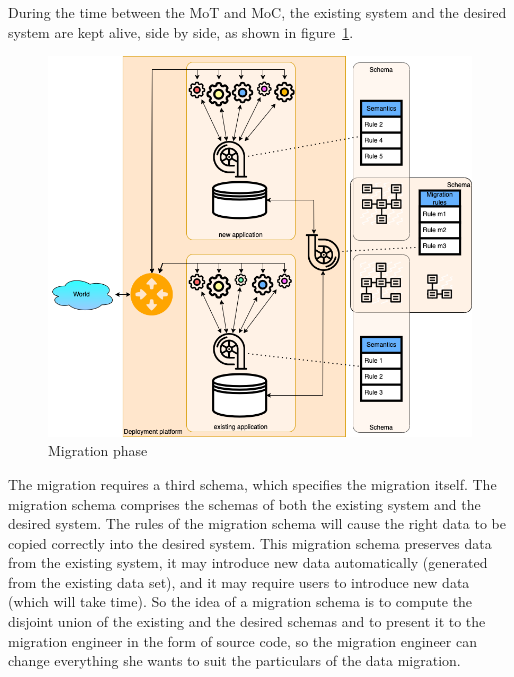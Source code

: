 \documentclass{elsarticle}
\begin{document}
   During the time between the MoT and MoC,
   the existing system and the desired system are kept alive, side by side, as shown in figure~\ref{fig:migration phase}.
\begin{figure}[bht]
   \begin{center}
     \includegraphics[scale=.35]{figures/datamigration-Migration phase.png}
   \end{center}
\caption{Migration phase}
\label{fig:migration phase}
\end{figure}

   The migration requires a third schema, which specifies the migration itself.
   The migration schema comprises the schemas of both the existing system and the desired system.
   The rules of the migration schema will cause the right data to be copied correctly into the desired system.
   This migration schema preserves data from the existing system, it may introduce new data automatically (generated from the existing data set),
   and it may require users to introduce new data (which will take time). 
   So the idea of a migration schema is to compute the disjoint union of the existing and the desired schemas
   and to present it to the migration engineer in the form of source code,
   so the migration engineer can change everything she wants to suit the particulars of the data migration.
\end{document}

